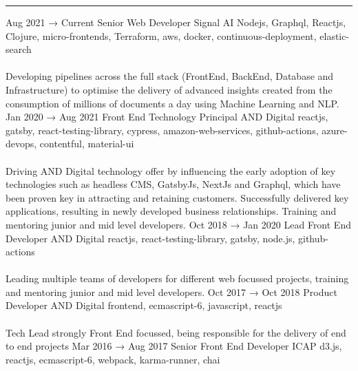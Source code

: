 \documentclass[9pt]{stackoverflow} %
\begin{document}
\textcolor{stackoverflow}{\hrule}
\vspace{4pt} %
\begin{tcolorbox}[blanker,width=0.75\textwidth,enlarge left by=0.25\textwidth,before skip=6pt,breakable,
	overlay unbroken and first={%
	  \node[inner sep=0pt,outer sep=0pt,text width=0.35\textwidth,
		align=none,
		below right]
		at ([xshift=-0.25\textwidth]frame.north west)
{
	\cvsect{Experience}
};}]
{\vspace{-16.3pt} %
	\small\begin{entrylist}
	\entry
		{Aug 2021 → Current}
		{Senior Web Developer}
		{Signal AI}
		{{Nodejs, Graphql, Reactjs, Clojure, micro-frontends, Terraform, aws, docker, continuous-deployment, elastic-search}\\\\
		Developing pipelines across the full stack (FrontEnd, BackEnd, Database and Infrastructure) to optimise the delivery of advanced insights created from the consumption of millions of documents a day using Machine Learning and NLP.
		}
	\entry
		{Jan 2020 → Aug 2021}
		{Front End Technology Principal}
		{AND Digital}
		{{reactjs, gatsby, react-testing-library, cypress, amazon-web-services, github-actions, azure-devops, contentful, material-ui}\\\\
		Driving AND Digital technology offer by influencing the early adoption of key technologies such as headless CMS, GatsbyJs, NextJs and Graphql, which have been proven key in attracting and retaining customers. Successfully delivered key applications, resulting in newly developed business relationships. Training and mentoring junior and mid level developers.}
	\entry
		{Oct 2018 → Jan 2020}
		{Lead Front End Developer}
		{AND Digital}
		{{reactjs, react-testing-library, gatsby, node.js, github-actions}\\\\
		Leading multiple teams of developers for different web focussed projects, training and mentoring junior and mid level developers.}
	\entry
		{Oct 2017 → Oct 2018}
		{Product Developer}
		{AND Digital}
		{{frontend, ecmascript-6, javascript, reactjs}\\\\
		Tech Lead strongly Front End focussed, being responsible for the delivery of end to end projects}
	\entry
		{Mar 2016 → Aug 2017}
		{Senior Front End Developer}
		{ICAP}
		{{d3.js, reactjs, ecmascript-6, webpack, karma-runner, chai}\\\\
}
\end{entrylist}}
\end{tcolorbox}
\end{document}
